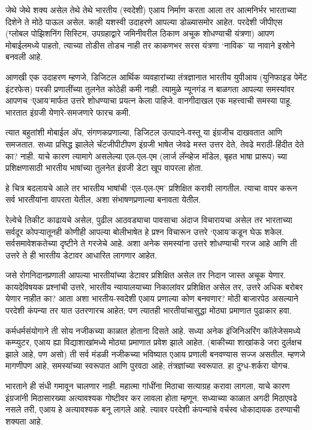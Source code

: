 जेथे जेथे शक्य असेल तेथे तेथे भारतीय (स्वदेशी) एआय निर्माण करता आला तर आत्मनिर्भर भारताच्या दिशेने ते मोठे पाऊल असेल. काही यशस्वी उदाहरणे आपल्या डोळ्यासमोर आहेत. परदेशी जीपीएस (ग्लोबल पोझिशनिंग सिस्टिम, उपग्रहाद्वारे जमिनीवरील ठिकाण अचूक शोधण्याची यंत्रणा) आपण मोबाईलमध्ये पाहतो, त्याच्या तोडीस तोडच नाही तर काकणभर सरस यंत्रणा ‘नाविक’ या नावाने इस्रोने बनवली आहे.

आणखी एक उदाहरण म्हणजे, डिजिटल आर्थिक व्यवहारांच्या तंत्रज्ञानात भारतीय युपीआय (युनिफाइड पेमेंट इंटरफेस) परकी प्रणालींच्या तुलनेत कोठेही कमी नाही. त्यामुळे न्यूनगंड न बाळगता आपल्या समस्यांवर आपणच ‘एआय’मार्फत उत्तरे शोधण्याचा प्रयत्न केला पाहिजे. वानगीदाखल एक महत्त्वाची समस्या पाहू. भारतात इंग्रजी येणारे-समजणारे फारच कमी.

त्यात बहुतांशी मोबाईल ॲप, संगणकप्रणाल्या, डिजिटल उत्पादने-वस्तू या इंग्रजीच दाखवतात आणि समजतात. सध्या प्रसिद्ध झालेले चॅटजीपीटीपण इंग्रजी भाषेत जेवढे मस्त उत्तर देते, तेवढे मराठी-हिंदीत देते का? नाही. याचे कारण त्यामागे असलेल्या एल-एल-एम (लार्ज लॅन्व्हेज मॉडेल, बृहत भाषा प्रारूप) च्या प्रशिक्षणासाठी भारतीय भाषांच्या तुलनेत इंग्रजी डेटा खूप वापरला होता.

हे चित्र बदलायचे आले तर भारतीय भाषांची ‘एल-एल-एम’ प्रशिक्षित करावी लागतील. त्याचा वापर करून सर्व भारतीयांना वापरता येतील, अशा संभाषणप्रणाल्या बनावता येतील.

रेल्वेचे तिकीट काढायचे असेल, पुढील आठवड्याचा पावसाचा अंदाज विचारायचा असेल तर भारताच्या सर्वदूर कोपऱ्यातूनही कोणीही आपल्या बोलीभाषेत हे प्रश्न विचारून उत्तरे ‘एआय’कडून घेऊ शकेल. सर्वसमावेशकतेच्या दृष्टीने ते गरजेचे आहे. अशा अनेक समस्यांना उत्तरे शोधण्याची गरज आहे आणि ती उत्तरे ते ही भारतीय डेटावर आधारित लागणार आहेत.

जसे रोगनिदानप्रणाली आपल्या भारतीयांच्या डेटावर प्रशिक्षित असेल तर निदान जास्त अचूक येणार. कायदेविषयक प्रश्नांची उत्तरे, भारतीय न्यायालयाच्या निकालांवर प्रशिक्षित असेल तर, उत्तरे अधिक बरोबर येणार नाहीत का? आता अशा भारतीय-स्वदेशी एआय प्रणाल्या कोण बनवणार? मोठी बाजारपेठ असल्याने परदेशी कंपन्या तर यात उतरणारच आहेत; पण त्यातही भारतीयांचासुद्धा मोठ्या प्रमाणात पुढाकार हवा.

कर्मधर्मसंयोगाने ती सोय नजीकच्या काळात होताना दिसते आहे. सध्या अनेक इंजिनिअरिंग कॉलेजेसमध्ये कम्प्युटर, एआय ह्या विद्याशाखांमध्ये मोठ्या प्रमाणात प्रवेश झाले आहेत. (बाकीच्या शाखांकडे जरा दुर्लक्षच झाले आहे, पण असो) ती सर्व मंडळी नजीकच्या भविष्यात एआय प्रणाली बनवण्यास सज्ज असतील. म्हणजे मागणीपण आहे, समस्यांच्या स्वरूपात आणि पुरवठा आहे; तंत्रज्ञांच्या स्वरूपात. हा दुग्ध-शर्करा योगच.

भारताने ही संधी गमावून चालणार नाही. महात्मा गांधींना मिठाचा सत्याग्रह करावा लागला, याचे कारण इंग्रजांनी मिठासारख्या अत्यावश्यक गोष्टीवर कर लावला होता म्हणून. सध्याच्या काळात अगदी मिठाएवढे नसले तरी, एआय हे अत्यावश्यक बनू लागले आहे. त्यावर परदेशी कंपन्यांचे वर्चस्व धोकादायक ठरण्याची शक्यता आहे.

